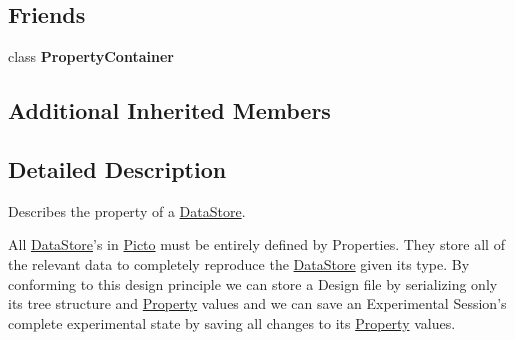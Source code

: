 \subsection*{Friends}
\begin{DoxyCompactItemize}
\item 
\hypertarget{class_picto_1_1_property_a7ff968ca40027b2b0500a9260b463e3a}{class {\bfseries Property\-Container}}\label{class_picto_1_1_property_a7ff968ca40027b2b0500a9260b463e3a}

\end{DoxyCompactItemize}
\subsection*{Additional Inherited Members}


\subsection{Detailed Description}
Describes the property of a \hyperlink{class_picto_1_1_data_store}{Data\-Store}. 

All \hyperlink{class_picto_1_1_data_store}{Data\-Store}'s in \hyperlink{namespace_picto}{Picto} must be entirely defined by Properties. They store all of the relevant data to completely reproduce the \hyperlink{class_picto_1_1_data_store}{Data\-Store} given its type. By conforming to this design principle we can store a Design file by serializing only its tree structure and \hyperlink{class_picto_1_1_property}{Property} values and we can save an Experimental Session's complete experimental state by saving all changes to its \hyperlink{class_picto_1_1_property}{Property} values.

